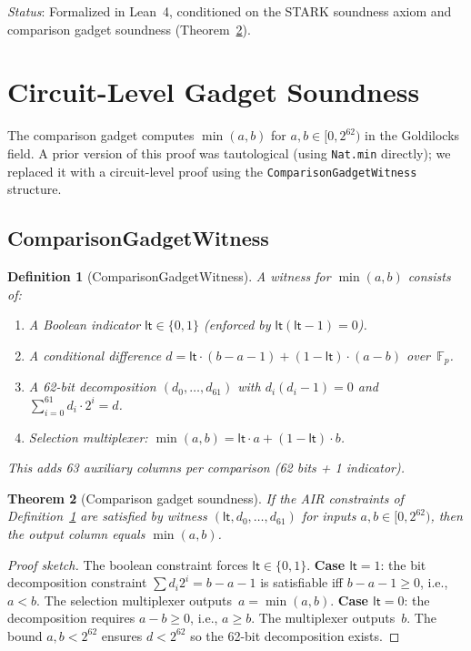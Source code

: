 \documentclass[11pt]{article}
\newtheorem{theorem}{Theorem}[section]
\newtheorem{definition}[theorem]{Definition}
\newcommand{\F}{\mathbb{F}}
\begin{document}
\emph{Status}: Formalized in Lean~4, conditioned on the STARK
soundness axiom and comparison gadget soundness (Theorem~\ref{thm:gadget}).


\section{Circuit-Level Gadget Soundness}\label{sec:gadgets}

The comparison gadget computes $\min(a,b)$ for
$a, b \in [0, 2^{62})$ in the Goldilocks field.
A prior version of this proof was tautological (using
\texttt{Nat.min} directly); we replaced it with a circuit-level
proof using the \texttt{ComparisonGadgetWitness} structure.

\subsection{ComparisonGadgetWitness}

\begin{definition}[ComparisonGadgetWitness]\label{def:cgw}
A witness for $\min(a,b)$ consists of:
\begin{enumerate}[nosep]
\item A Boolean indicator $\mathsf{lt} \in \{0,1\}$
  (enforced by $\mathsf{lt}(\mathsf{lt}-1)=0$).
\item A conditional difference
  $d = \mathsf{lt}\cdot(b - a - 1) + (1 - \mathsf{lt})\cdot(a - b)$
  over~$\F_p$.
\item A 62-bit decomposition $(d_0,\ldots,d_{61})$ with
  $d_i(d_i-1)=0$ and $\sum_{i=0}^{61} d_i \cdot 2^i = d$.
\item Selection multiplexer:
  $\min(a,b) = \mathsf{lt} \cdot a + (1-\mathsf{lt}) \cdot b$.
\end{enumerate}
This adds 63 auxiliary columns per comparison (62 bits + 1 indicator).
\end{definition}

\begin{theorem}[Comparison gadget soundness]\label{thm:gadget}
If the AIR constraints of Definition~\ref{def:cgw} are satisfied by
witness $(\mathsf{lt}, d_0, \ldots, d_{61})$ for inputs $a, b \in [0, 2^{62})$,
then the output column equals $\min(a,b)$.
\end{theorem}

\begin{proof}[Proof sketch]
The boolean constraint forces $\mathsf{lt} \in \{0,1\}$.
\textbf{Case $\mathsf{lt}=1$}: the bit decomposition constraint
$\sum d_i 2^i = b - a - 1$ is satisfiable iff $b - a - 1 \geq 0$,
i.e., $a < b$.  The selection multiplexer outputs~$a = \min(a,b)$.
\textbf{Case $\mathsf{lt}=0$}: the decomposition requires
$a - b \geq 0$, i.e., $a \geq b$.  The multiplexer outputs~$b$.
The bound $a, b < 2^{62}$ ensures $d < 2^{62}$ so the 62-bit
decomposition exists.
\end{proof}
\end{document}
